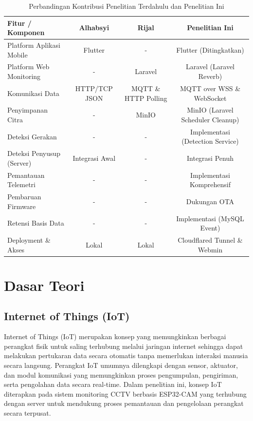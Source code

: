 \begin{table}[H]
	\centering
	\caption{Perbandingan Kontribusi Penelitian Terdahulu dan Penelitian Ini}
	\label{tab:perbandingan_penelitian}
	\begin{tabular}{|l|c|c|c|}
		\hline
		\textbf{Fitur / Komponen} & \textbf{Alhabsyi \cite{ali2025}} & \textbf{Rijal \cite{rijal2025}} & \textbf{Penelitian Ini} \\
		\hline
		Platform Aplikasi Mobile & Flutter & - & Flutter (Ditingkatkan) \\
		Platform Web Monitoring & - & Laravel & Laravel (Laravel Reverb) \\
		Komunikasi Data & HTTP/TCP JSON & MQTT \& HTTP Polling & MQTT over WSS \& WebSocket \\
		Penyimpanan Citra & - & MinIO & MinIO (Laravel Scheduler Cleanup) \\
		Deteksi Gerakan & - & - & Implementasi (Detection Service) \\
		Deteksi Penyusup (Server) & Integrasi Awal & - & Integrasi Penuh \\
		Pemantauan Telemetri & - & - & Implementasi Komprehensif \\
		Pembaruan Firmware & - & - & Dukungan OTA \\
		Retensi Basis Data & - & - & Implementasi (MySQL Event) \\
		Deployment \& Akses & Lokal & Lokal & Cloudflared Tunnel \& Webmin \\
		\hline
	\end{tabular}
\end{table}

\section{Dasar Teori}

\subsection{Internet of Things (IoT)}

Internet of Things (IoT) merupakan konsep yang memungkinkan berbagai perangkat fisik untuk saling terhubung melalui jaringan internet sehingga dapat melakukan pertukaran data secara otomatis tanpa memerlukan interaksi manusia secara langsung. Perangkat IoT umumnya dilengkapi dengan sensor, aktuator, dan modul komunikasi yang memungkinkan proses pengumpulan, pengiriman, serta pengolahan data secara real-time. Dalam penelitian ini, konsep IoT diterapkan pada sistem monitoring CCTV berbasis ESP32-CAM yang terhubung dengan server untuk mendukung proses pemantauan dan pengelolaan perangkat secara terpusat.

